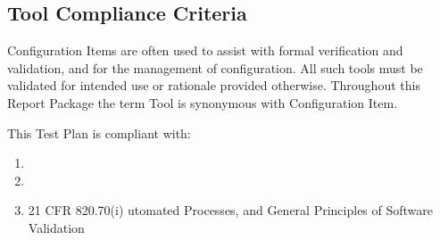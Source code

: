 \subsection{Tool Compliance Criteria}
Configuration Items are often used to assist with formal verification and
validation, and for the management of configuration.  All such tools must be
validated for intended use or rationale provided otherwise.  Throughout this
Report Package the term Tool is synonymous with Configuration Item.

This Test Plan is compliant with:
\begin{enumerate}
  \item \sopSDLC
  \item \sopSCM
  \item 21 CFR 820.70(i) utomated Processes, and General Principles of Software
    Validation
\end{enumerate}

